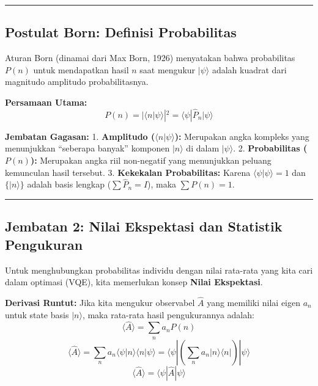 \begin{center}\rule{0.5\linewidth}{0.5pt}\end{center}

\hypertarget{postulat-born-definisi-probabilitas}{%
\subsection{Postulat Born: Definisi Probabilitas}\label{postulat-born-definisi-probabilitas}}

Aturan Born (dinamai dari Max Born, 1926) menyatakan bahwa probabilitas \(P(n)\) untuk mendapatkan hasil \(n\) saat mengukur \(|\psi\rangle\) adalah kuadrat dari magnitudo amplitudo probabilitasnya.

\textbf{Persamaan Utama:} \[ P(n) = | \langle n | \psi \rangle |^2 = \langle \psi | \hat{P}_n | \psi \rangle \]

\textbf{Jembatan Gagasan:} 1. \textbf{Amplitudo (\(\langle n | \psi \rangle\)):} Merupakan angka kompleks yang menunjukkan ``seberapa banyak'' komponen \(|n\rangle\) di dalam \(|\psi\rangle\). 2. \textbf{Probabilitas (\(P(n)\)):} Merupakan angka riil non-negatif yang menunjukkan peluang kemunculan hasil tersebut. 3. \textbf{Kekekalan Probabilitas:} Karena \(\langle \psi | \psi \rangle = 1\) dan \(\{|n\rangle\}\) adalah basis lengkap (\(\sum \hat{P}_n = I\)), maka \(\sum P(n) = 1\).

\begin{center}\rule{0.5\linewidth}{0.5pt}\end{center}

\hypertarget{jembatan-2-nilai-ekspektasi-dan-statistik-pengukuran}{%
\subsection{Jembatan 2: Nilai Ekspektasi dan Statistik Pengukuran}\label{jembatan-2-nilai-ekspektasi-dan-statistik-pengukuran}}

Untuk menghubungkan probabilitas individu dengan nilai rata-rata yang kita cari dalam optimasi (VQE), kita memerlukan konsep \textbf{Nilai Ekspektasi}.

\textbf{Derivasi Runtut:} Jika kita mengukur observabel \(\hat{A}\) yang memiliki nilai eigen \(a_n\) untuk state basis \(|n\rangle\), maka rata-rata hasil pengukurannya adalah: \[ \langle \hat{A} \rangle = \sum_n a_n P(n) \] \[ \langle \hat{A} \rangle = \sum_n a_n \langle \psi | n \rangle \langle n | \psi \rangle = \langle \psi | \left( \sum_n a_n |n\rangle\langle n| \right) | \psi \rangle \] \[ \langle \hat{A} \rangle = \langle \psi | \hat{A} | \psi \rangle \]

